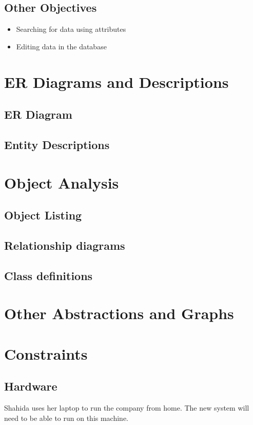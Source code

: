 \subsection{Other Objectives}

\begin{itemize}
    \item Searching for data using attributes
    \item Editing data in the database
\end{itemize}

\section{ER Diagrams and Descriptions}

\subsection{ER Diagram}
%

\subsection{Entity Descriptions}
%
\section{Object Analysis}

\subsection{Object Listing}
%
\subsection{Relationship diagrams}
%
\subsection{Class definitions}
%
\section{Other Abstractions and Graphs}

\section{Constraints}

\subsection{Hardware}
Shahida uses her laptop to run the company from home. The new system will need to be able to run on this machine.

